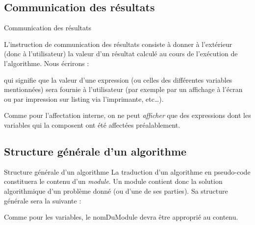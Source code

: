 \subsection{Communication des résultats}
\begin{frame}{Communication des résultats}

	L’instruction de communication des résultats consiste à donner à
	l’extérieur (donc à l’utilisateur) la valeur d’un résultat 
	calculé au cours de l’exécution de l’algorithme. Nous écrirons :


	qui signifie que la valeur d’une expression (ou celles des différentes
	variables mentionnées) sera fournie à l’utilisateur (par exemple par un
	affichage à l’écran ou par impression sur listing via l’imprimante,
	etc\dots).
	
	\bigskip
	
	Comme pour l’affectation interne, on ne peut \textit{afficher}
	que des expressions dont les variables qui la composent ont été 
	affectées préalablement.
\end{frame}

\subsection{Structure générale d’un algorithme}
\begin{frame}{Structure générale d’un algorithme}
	La traduction d’un algorithme en pseudo-code constituera le contenu d’un
	\textit{module}. Un module contient donc la solution
	algorithmique d’un problème donné (ou d’une de ses parties). Sa
	structure générale sera la suivante :

	
	Comme pour les variables, le nomDuModule devra être approprié au contenu.
\end{frame}


